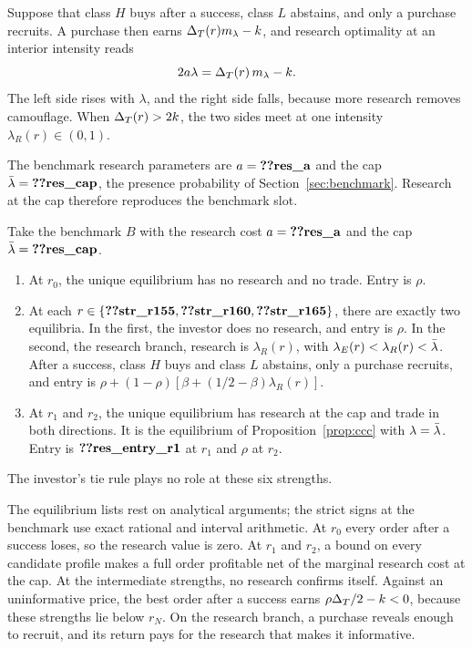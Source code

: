  Suppose that class \(H\) buys after a
success, class \(L\) abstains, and only a purchase recruits. A purchase then earns \(\Delta_T(r)m_\lambda-k\), and
research optimality at an interior intensity reads
\begin{equation}\label{eq:research}
2a\lambda=\Delta_T(r)\,m_\lambda-k .
\end{equation}
The left side rises with \(\lambda\), and the right side falls, because more research removes camouflage. When
\(\Delta_T(r)>2k\), the two sides meet at one intensity \(\lambda_R(r)\in(0,1)\).

The benchmark research parameters are \(a=\reg{res_a}\) and the cap \(\lb=\reg{res_cap}\), the presence
probability of Section~\ref{sec:benchmark}. Research at the cap therefore reproduces the benchmark slot.

\begin{proposition}\label{prop:research}
Take the benchmark \(B\) with the research cost \(a=\reg{res_a}\) and the cap \(\lb=\reg{res_cap}\).
\begin{enumerate}[label=(\roman*),leftmargin=2em]
\item At \(r_0\), the unique equilibrium has no research and no trade. Entry is \(\rho\).
\item At each \(r\in\{\reg{str_r155},\reg{str_r160},\reg{str_r165}\}\), there are exactly two equilibria. In the
first, the investor does no research, and entry is \(\rho\). In the second, the research branch, research is
\(\lambda_R(r)\), with \(\lambda_E(r)<\lambda_R(r)<\bar\lambda\). After a success, class \(H\) buys and class \(L\) abstains,
only a purchase recruits, and entry is \(\rho+(1-\rho)[\beta+(1/2-\beta)\lambda_R(r)]\).
\item At \(r_1\) and \(r_2\), the unique equilibrium has research at the cap and trade in both directions. It is the
equilibrium of Proposition~\ref{prop:ccc} with \(\lambda=\bar\lambda\). Entry is \(\reg{res_entry_r1}\) at \(r_1\) and
\(\rho\) at \(r_2\).
\end{enumerate}
The investor's tie rule plays no role at these six strengths.
\end{proposition}

The equilibrium lists rest on analytical arguments; the strict signs at the benchmark use exact rational and
interval arithmetic. At \(r_0\) every order after a success loses, so the research value is zero. At \(r_1\) and
\(r_2\), a bound on every candidate profile makes a full order profitable net of the marginal research cost at
the cap. At the intermediate strengths, no research confirms itself. Against an uninformative price,
the best order after a success earns \(\rho\Delta_T/2-k<0\), because these strengths lie below \(r_N\). On the
research branch, a purchase reveals enough to recruit, and its return pays for the research that makes it
informative.

